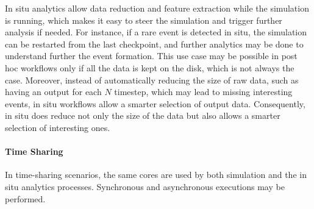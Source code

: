 In situ analytics allow data reduction and feature extraction while the simulation is running, which makes it easy to steer the simulation and trigger further analysis if needed. For instance, if a rare event is detected in situ, the simulation can be restarted from the last checkpoint, and further analytics may be done to understand further the event formation. This use case may be possible in post hoc workflows only if all the data is kept on the disk, which is not always the case. 
Moreover, instead of automatically reducing the size of raw data, such as having an output for each $N$ timestep, which may lead to missing interesting events, in situ workflows allow a smarter selection of output data. Consequently, in situ does reduce not only the size of the data but also allows a smarter selection of interesting ones.



\paragraph{Time Sharing}\label{sec:timesharing}

In time-sharing scenarios, the same cores are used by both simulation and the in situ analytics processes. Synchronous and asynchronous executions may be performed. 

